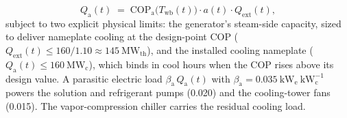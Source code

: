 \documentclass[sn-vancouver,Numbered]{sn-jnl}%
\begin{document}
\begin{equation}
\label{eq:abs_yield}
Q_{\mathrm{a}}(t) \;=\; \mathrm{COP}_{\mathrm{a}}\!\big(T_{\mathrm{wb}}(t)\big)\cdot a(t)\cdot Q_{\mathrm{ext}}(t),
\end{equation}
subject to two explicit physical limits: the generator's steam-side capacity, sized to deliver nameplate cooling at the design-point COP ($Q_{\mathrm{ext}}(t) \le 160/1.10 \approx 145~\mathrm{MW}_{\mathrm{th}}$), and the installed cooling nameplate ($Q_{\mathrm{a}}(t) \le 160~\mathrm{MW}_{\mathrm{c}}$), which binds in cool hours when the COP rises above its design value. A parasitic electric load $\beta_{\mathrm{a}}\, Q_{\mathrm{a}}(t)$ with $\beta_{\mathrm{a}}=0.035~\mathrm{kW}_{\mathrm{e}}~\mathrm{kW}_{\mathrm{c}}^{-1}$ powers the solution and refrigerant pumps (0.020) and the cooling-tower fans (0.015). The vapor-compression chiller carries the residual cooling load.
\end{document}
